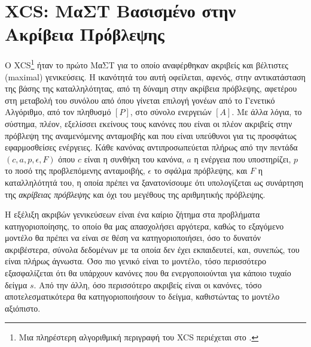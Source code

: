 \section{XCS: ΜαΣΤ Βασισμένο στην Ακρίβεια Πρόβλεψης} 
Ο XCS\footnote{Μια πληρέστερη αλγοριθμική περιγραφή του XCS περιέχεται στο \cite{butzXCS}.} ήταν το πρώτο ΜαΣΤ \cite{XCS} για το οποίο αναφέρθηκαν ακριβείς και βέλτιστες (maximal) γενικεύσεις. Η ικανότητά του αυτή οφείλεται, αφενός, στην αντικατάσταση της βάσης της καταλληλότητας, από τη δύναμη στην ακρίβεια πρόβλεψης, αφετέρου στη μεταβολή του συνόλου από όπου γίνεται επιλογή γονέων από το Γενετικό Αλγόριθμο, από τον πληθυσμό $[P]$, στο σύνολο ενεργειών $[A]$. Με άλλα λόγια, το σύστημα, πλέον, εξελίσσει εκείνους τους κανόνες που είναι οι πλέον ακριβείς στην πρόβλεψη της αναμενόμενης ανταμοιβής και που είναι υπεύθυνοι για τις προσφάτως εφαρμοσθείσες ενέργειες. Κάθε κανόνας αντιπροσωπεύεται πλήρως από την πεντάδα $(c, a, p, \epsilon, F)$ όπου $c$ είναι η συνθήκη του κανόνα, $a$ η ενέργεια που υποστηρίζει, $p$ το ποσό της προβλεπόμενης ανταμοιβής, $\epsilon$ το σφάλμα πρόβλεψης, και $F$ η καταλληλότητά του, η οποία πρέπει να ξανατονίσουμε ότι υπολογίζεται ως συνάρτηση της \emph{ακρίβειας πρόβλεψης} και όχι του μεγέθους της αριθμητικής πρόβλεψης.


Η εξέλιξη ακριβών γενικεύσεων είναι ένα καίριο ζήτημα στα προβλήματα κατηγοριοποίησης, το οποίο θα μας απασχολήσει αργότερα, καθώς το εξαγόμενο μοντέλο θα πρέπει να είναι σε θέση να κατηγοριοποιήσει, όσο το δυνατόν ακριβέστερα, σύνολα δεδομένων με τα οποία δεν έχει εκπαιδευτεί, και, συνεπώς, του είναι πλήρως άγνωστα. Όσο πιο γενικό είναι το μοντέλο, τόσο περισσότερο εξασφαλίζεται ότι θα υπάρχουν κανόνες που θα ενεργοποιούνται για 
κάποιο τυχαίο δείγμα $s$. Από την άλλη, όσο περισσότερο ακριβείς είναι οι κανόνες, τόσο αποτελεσματικότερα θα κατηγοριοποιήσουν το δείγμα, καθιστώντας το μοντέλο αξιόπιστο.


